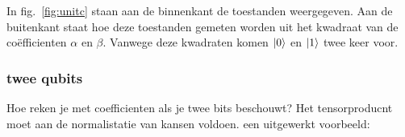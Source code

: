 \documentclass[../../main.tex]{subfiles}
\begin{document}
\begin{center}
\end{center}

In fig.~\ref{fig:unitc} staan aan de binnenkant de toestanden weergegeven. Aan de buitenkant staat hoe deze toestanden gemeten worden uit het kwadraat van de co\"efficienten $\alpha$ en $\beta$. Vanwege deze kwadraten komen $\ket{0}$ en $\ket{1}$ twee keer voor.

\subsubsection{twee qubits}
Hoe reken je met coefficienten als je twee bits beschouwt? Het tensorproducnt moet aan de normalistatie van kansen voldoen. een uitgewerkt voorbeeld: 
\end{document}
